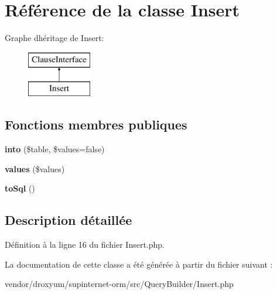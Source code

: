 \hypertarget{class_o_r_m_1_1_query_builder_1_1_insert}{}\section{Référence de la classe Insert}
\label{class_o_r_m_1_1_query_builder_1_1_insert}
Graphe d\textquotesingle{}héritage de Insert\+:\begin{figure}[H]
\begin{center}
\leavevmode
\includegraphics[height=2.000000cm]{class_o_r_m_1_1_query_builder_1_1_insert}
\end{center}
\end{figure}
\subsection*{Fonctions membres publiques}
\begin{DoxyCompactItemize}
\item 
{\bfseries into} (\$table, \$values=false)\hypertarget{class_o_r_m_1_1_query_builder_1_1_insert_adc5b0893831069348a8e03796fb4c968}{}\label{class_o_r_m_1_1_query_builder_1_1_insert_adc5b0893831069348a8e03796fb4c968}

\item 
{\bfseries values} (\$values)\hypertarget{class_o_r_m_1_1_query_builder_1_1_insert_adc4887e0ad5db85ebaddfdbb3f5018fb}{}\label{class_o_r_m_1_1_query_builder_1_1_insert_adc4887e0ad5db85ebaddfdbb3f5018fb}

\item 
{\bfseries to\+Sql} ()\hypertarget{class_o_r_m_1_1_query_builder_1_1_insert_a63f8ba861f1ecabe359d454fde60d395}{}\label{class_o_r_m_1_1_query_builder_1_1_insert_a63f8ba861f1ecabe359d454fde60d395}

\end{DoxyCompactItemize}


\subsection{Description détaillée}


Définition à la ligne 16 du fichier Insert.\+php.



La documentation de cette classe a été générée à partir du fichier suivant \+:\begin{DoxyCompactItemize}
\item 
vendor/droxyum/supinternet-\/orm/src/\+Query\+Builder/Insert.\+php\end{DoxyCompactItemize}
